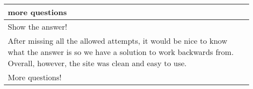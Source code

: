 \begin{longtable}{|p{1\linewidth}|}
		\hline
		more questions                                                                                                                                                                                                                                                                                                                                                                                                                                                                                                                                                                                                                                                                                   \\
		\hline
		Show the answer!                                                                                                                                                                                                                                                                                                                                                                                                                                                                                                                                                                                                                                                                                 \\
		\hline
		After missing all the allowed attempts, it would be nice to know what the answer is so we have a solution to work backwards from. Overall, however, the site was clean and easy to use.                                                                                                                                                                                                                                                                                                                                                                                                                                                                                                          \\
		\hline
		More questions!                                                                                                                                                                                                                                                                                                                                                                                                                                                                                                                                                                                                                                                                                  \\

\end{longtable}
